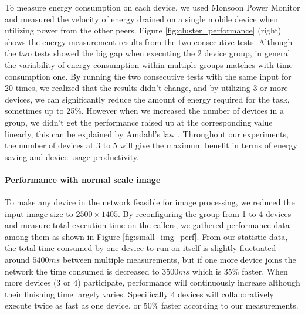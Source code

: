 \documentclass{sig-alternate}[10pt]
\begin{document}
To measure energy consumption on each device, we used Monsoon Power Monitor \cite{moosoon} and measured the velocity of energy drained on a single mobile device when utilizing power from the other peers. Figure \ref{fig:cluster_performance} (right) shows the energy measurement results from the two consecutive tests. Although the two tests showed the big gap when executing the 2 device group, in general the variability of energy consumption within multiple groups matches with time consumption one. By running the two consecutive tests with the same input for 20 times, we realized that the results didn't change, and by utilizing 3 or more devices, we can significantly reduce the amount of energy required for the task, sometimes up to 25\%. However when we increased the number of devices in a group, we didn't get the performance raised up at the corresponding value linearly, this can be explained by Amdahl's law \cite{amdahl}. Throughout our experiments, the number of devices at 3 to 5 will give the maximum benefit in terms of energy saving and device usage productivity.

\paragraph{Performance with normal scale image}
To make any device in the network feasible for image processing, we reduced the input image size to $2500 \times 1405$. By reconfiguring the group from 1 to 4 devices and measure total execution time on the callers, we gathered performance data among them as shown in Figure \ref{fig:small_img_perf}. From our statistic data, the total time consumed by one device to run on itself is slightly fluctuated around $5400ms$ between multiple measurements, but if one more device joins the network the time consumed is decreased to $3500ms$ which is 35\% faster. When more devices (3 or 4) participate, performance will continuously increase although their finishing time largely varies. Specifically 4 devices will collaboratively execute twice as fast as one device, or 50\% faster according to our measurements.
\end{document}
